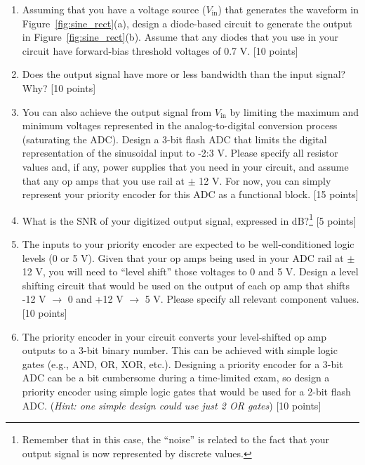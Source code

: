 \begin{enumerate}
  \item Assuming that you have a voltage source ($V_\textrm{in}$) that
    generates the waveform in Figure~\ref{fig:sine_rect}(a), design a
    diode-based circuit to generate the output in
    Figure~\ref{fig:sine_rect}(b).  Assume that any diodes that you use in your
    circuit have forward-bias threshold voltages of 0.7 V. [10 points]

  \item Does the output signal have more or less bandwidth than the input
    signal?  Why? [10 points]

  \item You can also achieve the output signal from $V_\textrm{in}$ by limiting
    the maximum and minimum voltages represented in the analog-to-digital
    conversion process (saturating the ADC).  Design a 3-bit flash ADC that
    limits the digital representation of the sinusoidal input to -2:3 V.
    Please specify all resistor values and, if any, power supplies that you need
    in your circuit, and assume that any op amps that you use rail at
    $\pm$ 12 V.  For now, you can simply represent your priority encoder for
    this ADC as a functional block. [15 points]

  \item What is the SNR of your digitized output signal, expressed in
    dB?\footnote{Remember that in this case, the ``noise'' is related to the
    fact that your output signal is now represented by discrete values.} [5
    points]

  \item The inputs to your priority encoder are expected to be well-conditioned
    logic levels (0 or 5 V).  Given that your op amps being used in your ADC
    rail at $\pm$ 12 V, you will need to ``level shift'' those voltages to 0
    and 5 V.  Design a level shifting circuit that would be used on the output
    of each op amp that shifts -12 V $\rightarrow$ 0 and +12 V $\rightarrow$ 5 V.
    Please specify all relevant component values. [10 points]

  \item The priority encoder in your circuit converts your level-shifted op amp
  outputs to a 3-bit binary number.  This can be achieved with simple logic
  gates (e.g., AND, OR, XOR, etc.).  Designing a priority encoder for a 3-bit
  ADC can be a bit cumbersome during a time-limited exam, so design a priority
  encoder using simple logic gates that would be used for a 2-bit flash ADC.
  ({\it Hint: one simple design could use just 2 OR gates}) [10 points]  


\end{enumerate}
